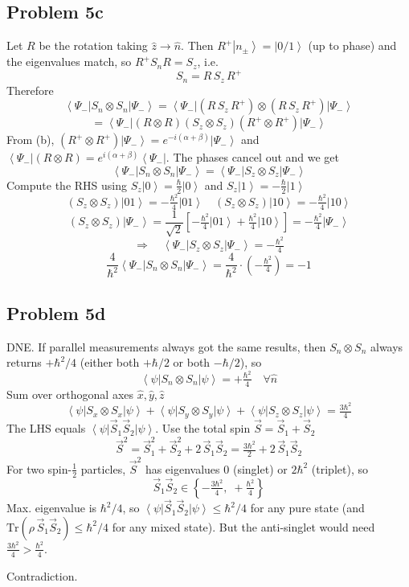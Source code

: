 \documentclass[
]{article}
\providecommand{\ket}[1]{\left\lvert #1 \right\rangle}
\providecommand{\bra}[1]{\left\langle #1 \right\rvert}
\providecommand{\Rarr}{\Rightarrow}
\begin{document}
\subsection*{Problem 5c}
Let $R$ be the rotation taking $\hat{z}\to\hat{n}$. Then $R^+\ket{n_\pm}=\ket{0/1}$ (up to phase) and the eigenvalues match, so $R^+ S_n R=S_z$, i.e.
\[
	S_n=R\,S_z\,R^+
\]
Therefore
\[
	\bra{\Psi_-}S_n\otimes S_n\ket{\Psi_-}=\bra{\Psi_-}(R\,S_z\,R^+)\otimes(R\,S_z\,R^+)\ket{\Psi_-}
\]
\[
	=\bra{\Psi_-}(R\otimes R)(S_z\otimes S_z)(R^+\otimes R^+)\ket{\Psi_-}
\]
From (b), $(R^+\otimes R^+)\ket{\Psi_-}=e^{-i(\alpha+\beta)}\ket{\Psi_-}$ and $\bra{\Psi_-}(R\otimes R)=e^{i(\alpha+\beta)}\bra{\Psi_-}$. The phases cancel out and we get
\[
	\bra{\Psi_-}S_n\otimes S_n\ket{\Psi_-}=\bra{\Psi_-}S_z\otimes S_z\ket{\Psi_-}
\]
Compute the RHS using $S_z\ket{0}=\tfrac{\hbar}{2}\ket{0}$ and $S_z\ket{1}=-\tfrac{\hbar}{2}\ket{1}$
\[
	(S_z\otimes S_z)\ket{01}=-\tfrac{\hbar^2}{4}\ket{01}\quad (S_z\otimes S_z)\ket{10}=-\tfrac{\hbar^2}{4}\ket{10}
\]
\[
	(S_z\otimes S_z)\ket{\Psi_-}=\frac{1}{\sqrt{2}}\left[-\tfrac{\hbar^2}{4}\ket{01}+\tfrac{\hbar^2}{4}\ket{10}\right]=-\tfrac{\hbar^2}{4}\ket{\Psi_-}
\]
\[
	\Rarr\quad \bra{\Psi_-}S_z\otimes S_z\ket{\Psi_-}=-\tfrac{\hbar^2}{4}
\]
\[
	\frac{4}{\hbar^2}\bra{\Psi_-}S_n\otimes S_n\ket{\Psi_-}=\frac{4}{\hbar^2}\cdot\left(-\tfrac{\hbar^2}{4}\right)=-1
\]

\subsection*{Problem 5d}
DNE. If parallel measurements always got the same results, then $S_n\otimes S_n$ always returns $+\hbar^2/4$ (either both $+\hbar/2$ or both $-\hbar/2$), so
\[
	\bra{\psi}S_n\otimes S_n\ket{\psi}=+\tfrac{\hbar^2}{4}\quad\forall\hat{n}
\]
Sum over orthogonal axes $\hat{x},\hat{y},\hat{z}$
\[
	\bra{\psi}S_x\otimes S_x\ket{\psi}+\bra{\psi}S_y\otimes S_y\ket{\psi}+\bra{\psi}S_z\otimes S_z\ket{\psi}=\tfrac{3\hbar^2}{4}
\]
The LHS equals $\bra{\psi}\vec{S}_1\vec{S}_2\ket{\psi}$. Use the total spin $\vec{S}=\vec{S}_1+\vec{S}_2$
\[
	\vec{S}^2=\vec{S}_1^2+\vec{S}_2^2+2\,\vec{S}_1\vec{S}_2=\tfrac{3\hbar^2}{2}+2\,\vec{S}_1\vec{S}_2
\]
For two spin-$\tfrac{1}{2}$ particles, $\vec{S}^2$ has eigenvalues $0$ (singlet) or $2\hbar^2$ (triplet), so
\[
	\vec{S}_1\vec{S}_2\in\left\{-\tfrac{3\hbar^2}{4},\;+\tfrac{\hbar^2}{4}\right\}
\]
Max. eigenvalue is $\hbar^2/4$, so $\bra{\psi}\vec{S}_1\vec{S}_2\ket{\psi}\leq\hbar^2/4$ for any pure state (and $\mathrm{Tr}(\rho\,\vec{S}_1\vec{S}_2)\leq\hbar^2/4$ for any mixed state). But the anti-singlet would need $\tfrac{3\hbar^2}{4}>\tfrac{\hbar^2}{4}$.

Contradiction.
\end{document}
